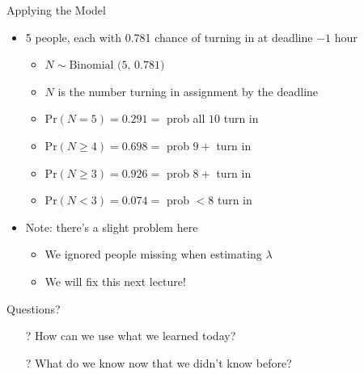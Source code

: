 \documentclass[aspectratio=169]{beamer}
\begin{document}
\begin{frame}{Applying the Model}

\begin{itemize}
	\item 5 people, each with 0.781 chance of turning in at deadline $- 1$ hour
	\begin{itemize}	
	\item $N \sim \textrm{Binomial (5, 0.781)}$
	\item $N$ is the number turning in assignment by the deadline
	\item Pr$(N = 5) = 0.291 = $ prob all $10$ turn in %
	\item Pr$(N \geq 4) = 0.698 = $ prob $9+$ turn in %
	\item Pr$(N \geq 3) = 0.926 = $ prob $8+$ turn in %
	\item Pr$(N < 3) = 0.074 = $ prob $< 8$ turn in %
	\end{itemize}
	\item Note: there's a slight problem here
	\begin{itemize}
	\item We ignored people missing when estimating $\lambda$
	\item We will fix this next lecture!
	\end{itemize}
\end{itemize}


\end{frame}


\begin{frame}{Questions?}
\begin{itemize}
	\item[?] How can we use what we learned today?
	\vspace{2em}
	\item[?] What do we know now that we didn't know before?
\end{itemize}
\end{frame}
\end{document}
